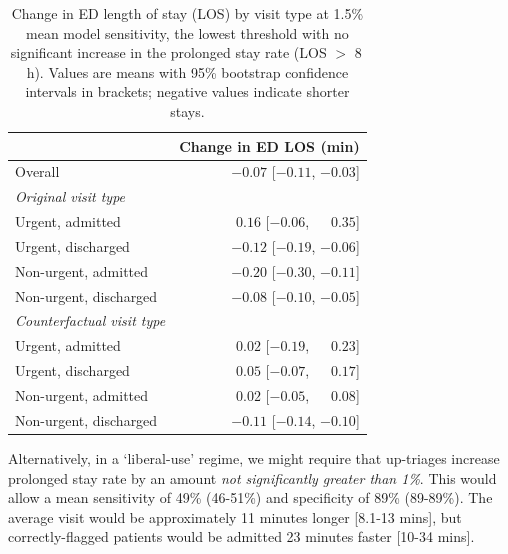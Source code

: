 \begin{table}[htbp]
\centering
\small
\caption{Change in ED length of stay (LOS) by visit type at  1.5\% mean model sensitivity, the lowest threshold with no significant increase in the prolonged stay rate (LOS $>$ 8\,h). Values are means with 95\% bootstrap confidence intervals in brackets; negative values indicate shorter stays.}
\label{tab:los_visit_type_0}
\begin{tabular}{lr}
\toprule
 & Change in ED LOS (min) \\
\midrule
Overall & $-0.07$ [$-0.11$, $-0.03$] \\
\addlinespace
\textit{Original visit type} & \\
\quad Urgent, admitted & $\phantom{-}0.16$ [$-0.06$, $\phantom{-}0.35$] \\
\quad Urgent, discharged & $-0.12$ [$-0.19$, $-0.06$] \\
\quad Non-urgent, admitted & $-0.20$ [$-0.30$, $-0.11$] \\
\quad Non-urgent, discharged & $-0.08$ [$-0.10$, $-0.05$] \\
\addlinespace
\textit{Counterfactual visit type} & \\
\quad Urgent, admitted & $\phantom{-}0.02$ [$-0.19$, $\phantom{-}0.23$] \\
\quad Urgent, discharged & $\phantom{-}0.05$ [$-0.07$, $\phantom{-}0.17$] \\
\quad Non-urgent, admitted & $\phantom{-}0.02$ [$-0.05$, $\phantom{-}0.08$] \\
\quad Non-urgent, discharged & $-0.11$ [$-0.14$, $-0.10$] \\
\bottomrule
\end{tabular}
\end{table}


Alternatively, in a `liberal-use' regime, we might require that up-triages increase prolonged stay rate by an amount \textit{not significantly greater than 1\%}. This would allow a mean sensitivity of 49\% (46-51\%) and specificity of 89\% (89-89\%). The average visit would be approximately 11 minutes longer [8.1-13 mins], but correctly-flagged patients would be admitted 23 minutes faster [10-34 mins]. 
    
